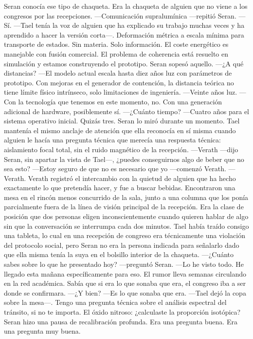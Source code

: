 \documentclass[11pt,a5paper,twoside]{book}
\begin{document}
Seran conocía ese tipo de chaqueta. Era la chaqueta de alguien que no viene a los congresos por las recepciones.
—Comunicación supralumínica —repitió Seran.
—Sí. —Tael tenía la voz de alguien que ha explicado su trabajo muchas veces y ha aprendido a hacer la versión corta—. Deformación métrica a escala mínima para transporte de estados. Sin materia. Solo información. El coste energético es manejable con fusión comercial. El problema de coherencia está resuelto en simulación y estamos construyendo el prototipo.
Seran sopesó aquello.
—¿A qué distancias?
—El modelo actual escala hasta diez años luz con parámetros de prototipo. Con mejoras en el generador de contención, la distancia teórica no tiene límite físico intrínseco, solo limitaciones de ingeniería.
—Veinte años luz.
—Con la tecnología que tenemos en este momento, no. Con una generación adicional de hardware, posiblemente sí.
—¿Cuánto tiempo?
—Cuatro años para el sistema operativo inicial. Quizás tres.
Seran lo miró durante un momento. Tael mantenía el mismo anclaje de atención que ella reconocía en sí misma cuando alguien le hacía una pregunta técnica que merecía una respuesta técnica: aislamiento focal total, sin el ruido magnético de la recepción.
—Verath —dijo Seran, sin apartar la vista de Tael—, ¿puedes conseguirnos algo de beber que no sea esto?
—Estoy seguro de que no es necesario que yo —comenzó Verath.
—Verath.
Verath registró el intercambio con la quietud de alguien que ha hecho exactamente lo que pretendía hacer, y fue a buscar bebidas.
Encontraron una mesa en el rincón menos concurrido de la sala, junto a una columna que los ponía parcialmente fuera de la línea de visión principal de la recepción. Era la clase de posición que dos personas eligen inconscientemente cuando quieren hablar de algo sin que la conversación se interrumpa cada dos minutos.
Tael había traído consigo una tableta, lo cual en una recepción de congreso era técnicamente una violación del protocolo social, pero Seran no era la persona indicada para señalarlo dado que ella misma tenía la suya en el bolsillo interior de la chaqueta.
—¿Cuánto sabes sobre lo que he presentado hoy? —preguntó Seran.
—Lo he visto todo. He llegado esta mañana específicamente para eso. El rumor lleva semanas circulando en la red académica. Sabía que si era lo que sonaba que era, el congreso iba a ser donde se confirmara.
—¿Y bien?
—Es lo que sonaba que era. —Tael dejó la copa sobre la mesa—. Tengo una pregunta técnica sobre el análisis espectral del tránsito, si no te importa. El óxido nitroso: ¿calculaste la proporción isotópica?
Seran hizo una pausa de recalibración profunda. Era una pregunta buena. Era una pregunta muy buena.
\end{document}
